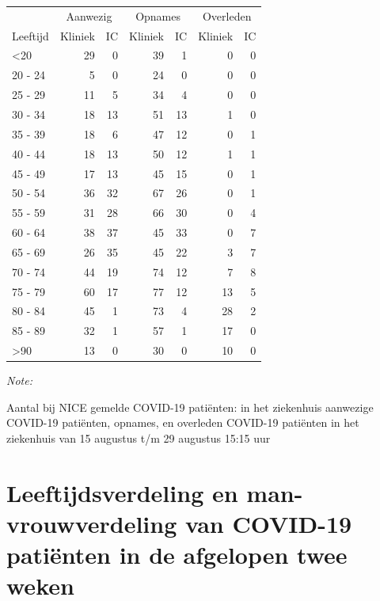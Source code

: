 \documentclass[
  english,
  man,floatsintext]{apa6}
\begin{document}
\begin{table}
\centering\begingroup\fontsize{10}{12}\selectfont

\begin{threeparttable}
\begin{tabular}{lrrrrrr}
\toprule
\multicolumn{1}{c}{ } & \multicolumn{2}{c}{Aanwezig} & \multicolumn{2}{c}{Opnames} & \multicolumn{2}{c}{Overleden} \\
\cmidrule(l{3pt}r{3pt}){2-3} \cmidrule(l{3pt}r{3pt}){4-5} \cmidrule(l{3pt}r{3pt}){6-7}
Leeftijd & Kliniek & IC & Kliniek & IC & Kliniek & IC\\
\midrule
<20 & 29 & 0 & 39 & 1 & 0 & 0\\
20 - 24 & 5 & 0 & 24 & 0 & 0 & 0\\
25 - 29 & 11 & 5 & 34 & 4 & 0 & 0\\
30 - 34 & 18 & 13 & 51 & 13 & 1 & 0\\
35 - 39 & 18 & 6 & 47 & 12 & 0 & 1\\
40 - 44 & 18 & 13 & 50 & 12 & 1 & 1\\
45 - 49 & 17 & 13 & 45 & 15 & 0 & 1\\
50 - 54 & 36 & 32 & 67 & 26 & 0 & 1\\
55 - 59 & 31 & 28 & 66 & 30 & 0 & 4\\
60 - 64 & 38 & 37 & 45 & 33 & 0 & 7\\
65 - 69 & 26 & 35 & 45 & 22 & 3 & 7\\
70 - 74 & 44 & 19 & 74 & 12 & 7 & 8\\
75 - 79 & 60 & 17 & 77 & 12 & 13 & 5\\
80 - 84 & 45 & 1 & 73 & 4 & 28 & 2\\
85 - 89 & 32 & 1 & 57 & 1 & 17 & 0\\
>90 & 13 & 0 & 30 & 0 & 10 & 0\\
\bottomrule
\end{tabular}
\begin{tablenotes}
\item \textit{Note: } 
\item Aantal bij NICE gemelde COVID-19 patiënten: in het ziekenhuis aanwezige COVID-19 patiënten, opnames, en overleden COVID-19 patiënten in het ziekenhuis van 15 augustus t/m 29 augustus 15:15 uur
\end{tablenotes}
\end{threeparttable}
\endgroup{}
\end{table}

\newpage

\hypertarget{leeftijdsverdeling-en-man-vrouwverdeling-van-covid-19-patiuxebnten-in-de-afgelopen-twee-weken}{%
\section{Leeftijdsverdeling en man-vrouwverdeling van COVID-19 patiënten in de afgelopen twee weken}\label{leeftijdsverdeling-en-man-vrouwverdeling-van-covid-19-patiuxebnten-in-de-afgelopen-twee-weken}}
\end{document}
